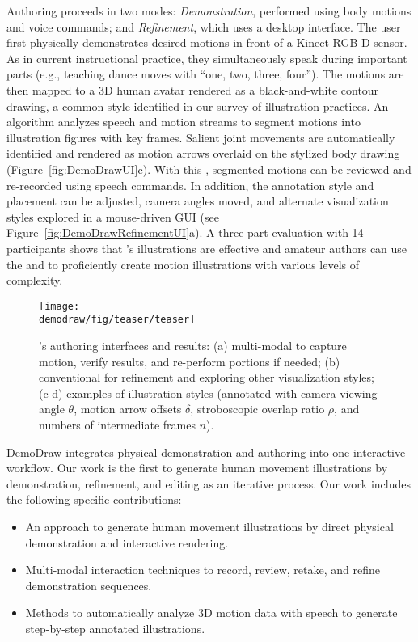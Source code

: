 Authoring proceeds in two modes: {\em Demonstration}, performed using body motions and voice commands; and {\em Refinement}, which uses a desktop interface.
%
The user first physically demonstrates desired motions in front of a Kinect RGB-D sensor. As in current instructional practice, they simultaneously speak during important parts (e.g., teaching dance moves with ``one, two, three, four'').
The motions are then mapped to a 3D human avatar rendered as a black-and-white contour drawing, a common style identified in our survey of illustration practices.
%
An algorithm analyzes speech and motion streams to segment motions into illustration figures with key frames. Salient joint movements are automatically identified and rendered as motion arrows overlaid on the stylized body drawing (Figure~\ref{fig:DemoDrawUI}c).
%
With this {\em \phaseI{}}, segmented motions can be reviewed and re-recorded using speech commands.
In addition, the annotation style and placement can be adjusted, camera angles moved, and alternate visualization styles explored in a mouse-driven GUI \emph{\phaseII{}} (see Figure~\ref{fig:DemoDrawRefinementUI}a).
%
A three-part evaluation with 14 participants shows that \systemname{}'s illustrations are effective and amateur authors can use the \phaseI{} and \phaseII{} to proficiently create motion illustrations with various levels of complexity.

\begin{figure*}[t!]
  \centering
  \texttt{[image: \\demodraw/fig/teaser/teaser]}
  \caption{\systemname{}'s authoring interfaces and results: (a) multi-modal \textit{\phaseI{}} to capture motion, verify results, and re-perform portions if needed; (b) conventional \textit{\phaseII{}} for refinement and exploring other visualization styles; (c-d) examples of illustration styles (annotated with camera viewing angle $\theta$, motion arrow offsets $\delta$, stroboscopic overlap ratio $\rho$, and numbers of intermediate frames $n$).}
  \label{fig:demodraw_teaser}
\end{figure*}

DemoDraw integrates physical demonstration and authoring into one interactive workflow. Our work is the first to generate human movement illustrations by demonstration, refinement, and editing as an iterative process. %
Our work includes the following specific contributions:

\begin{itemize}
  \item An approach to generate human movement illustrations by direct physical demonstration and interactive rendering.
  \item Multi-modal interaction techniques to record, review, retake, and refine demonstration sequences.
  \item Methods to automatically analyze 3D motion data with speech to generate step-by-step annotated illustrations.
\end{itemize}

